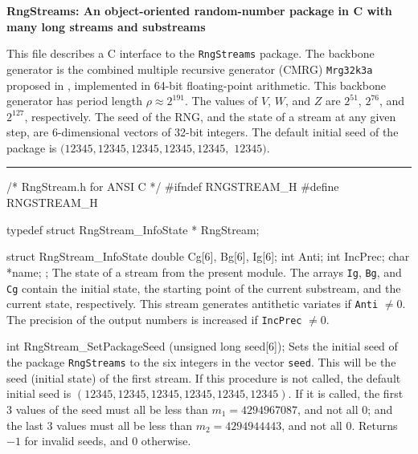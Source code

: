 \documentclass[12pt]{article}
\begin{document}
\begin{center}
{\large\bf RngStreams: An object-oriented random-number package in C
 with many long streams and substreams}\\
\date{5 Jan. 2010}
\end{center}


\bigskip


This file describes a C interface to the {\tt RngStreams} package.
The backbone generator is the combined multiple recursive 
generator (CMRG) {\tt Mrg32k3a} proposed in \cite{rLEC99b},
implemented in 64-bit floating-point arithmetic.
This backbone generator has period length $\rho\approx 2^{191}$.
The values of $V$, $W$, and $Z$ are $2^{51}$, $2^{76}$, and $2^{127}$,
respectively. %
The seed of the RNG, and the state of a stream at any given step,
are 6-dimensional vectors of 32-bit integers.
The default initial seed of the package is 
$(12345, 12345, 12345, 12345, 12345,$  $12345)$.




\bigskip\hrule

\code\hide
/* RngStream.h for ANSI C */
#ifndef RNGSTREAM_H
#define RNGSTREAM_H
\endhide


typedef struct RngStream_InfoState * RngStream;

struct RngStream_InfoState {
   double Cg[6], Bg[6], Ig[6];
   int Anti;
   int IncPrec;
   char *name;
};
\endcode
 \tab
   The state of a stream from the present module.
   The arrays {\tt Ig}, {\tt Bg}, and {\tt Cg} contain the initial state, 
   the starting point of the current substream,
   and the current state, respectively.
   This stream generates antithetic variates if {\tt Anti} $\neq 0$.
   The precision of the output numbers is increased if {\tt IncPrec} $\neq 0$.
 \endtab
\code

int RngStream_SetPackageSeed (unsigned long seed[6]);
\endcode
  \tab  Sets the initial seed of the package {\tt RngStreams} to the 
   six integers in the vector {\tt seed}.
   This will be the seed (initial state) of the first stream.
   If this procedure is not called, the default initial seed
   is $(12345, 12345, 12345, 12345, 12345, 12345)$.
   If it is called, the first 3 values of the seed must all be
   less than $m_1 = 4294967087$, and not all 0;
   and the last 3 values 
   must all be less than $m_2 = 4294944443$, and not all 0.
   Returns $-1$ for invalid seeds, and 0 otherwise.
 \endtab
\code
\end{document}
